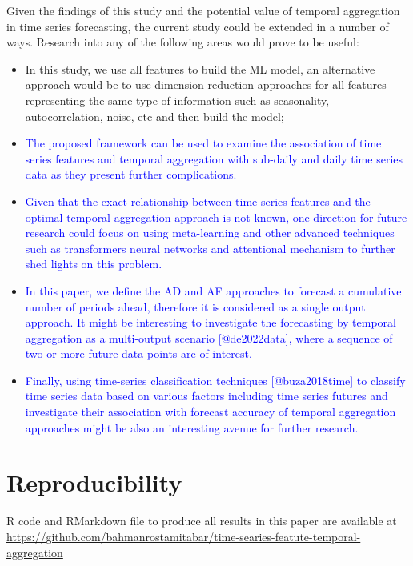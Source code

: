 \documentclass[preprint, 3p,
authoryear]{elsarticle} %
\begin{document}
Given the findings of this study and the potential value of temporal
aggregation in time series forecasting, the current study could be
extended in a number of ways. Research into any of the following areas
would prove to be useful:

\begin{itemize}
\item
  In this study, we use all features to build the ML model, an
  alternative approach would be to use dimension reduction approaches
  for all features representing the same type of information such as
  seasonality, autocorrelation, noise, etc and then build the model;
\item
  \textcolor{blue}{The proposed framework can be used to examine the association of time series features and temporal aggregation with sub-daily and daily time series data as they present further complications.}
\item
  \textcolor{blue}{Given that the exact relationship between time series features and the optimal temporal aggregation approach is not known, one direction for future research could focus on using meta-learning and other advanced techniques such as transformers neural networks and attentional mechanism to further shed lights on this problem.}
\item
  \textcolor{blue}{In this paper, we define the AD and AF approaches to forecast a cumulative number of periods ahead, therefore it is considered as a single output approach. It might be interesting to investigate the forecasting by temporal aggregation as a multi-output scenario [@de2022data], where a sequence of two or more future data points are of interest.}
\item
  \textcolor{blue}{Finally, using time-series classification techniques [@buza2018time] to classify time series data based on various factors including time series futures and investigate their association with forecast accuracy of temporal aggregation approaches might be also an interesting avenue for further research.}
\end{itemize}

\hypertarget{reproducibility}{%
\section*{Reproducibility}\label{reproducibility}}

R code and RMarkdown file to produce all results in this paper are
available at
\url{https://github.com/bahmanrostamitabar/time-searies-featute-temporal-aggregation}
\end{document}
